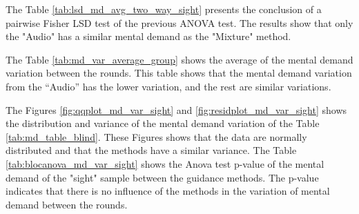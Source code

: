 The Table \ref{tab:lsd_md_avg_two_way_sight} presents the conclusion of a pairwise Fisher LSD test of the previous ANOVA test. The results show that only the "Audio" has a similar mental demand as the "Mixture" method.



The Table \ref{tab:md_var_average_group} shows the average of the mental demand variation between the rounds. This table shows that the mental demand variation from the “Audio” has the lower variation, and the rest are similar variations.



The Figures \ref{fig:qqplot_md_var_sight} and \ref{fig:residplot_md_var_sight} shows the distribution and variance of the mental demand variation of the Table \ref{tab:md_table_blind}. These Figures shows that the data are normally distributed and that the methods have a similar variance.
The Table \ref{tab:blocanova_md_var_sight} shows the Anova test p-value of the mental demand of the "sight" sample between the guidance methods. The p-value indicates that there is no influence of the methods in the variation of mental demand between the rounds. 




